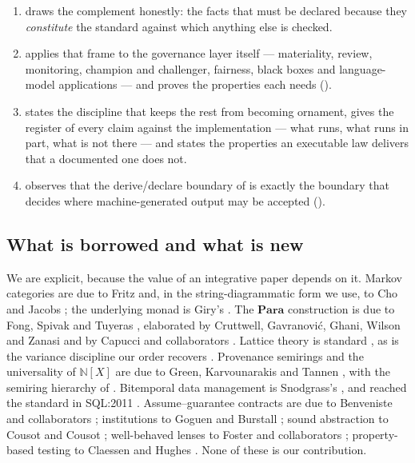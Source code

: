 \documentclass[11pt,a4paper]{article}
\renewcommand{\_}{\oldunderscore\allowbreak}
\theoremstyle{plain}
\theoremstyle{definition}
\theoremstyle{definition}
\theoremstyle{remark}
\newcommand{\Para}{\mathbf{Para}}
\newcommand{\Nat}{\mathbb{N}}
\begin{document}
\begin{enumerate}[leftmargin=*,itemsep=3pt]
      and totality together ().  treats the one class whose
      parameter object has logical rather than numerical structure, and states exactly what becomes
      decidable there and what does not ().
\item {} draws the complement honestly: the facts that must be declared because they
      \emph{constitute} the standard against which anything else is checked.
\item {} applies that frame to the governance layer itself --- materiality, review,
      monitoring, champion and challenger, fairness, black boxes and language-model applications --- and
      proves the properties each needs ().
\item {} states the discipline that keeps the rest from becoming ornament, gives the
      register of every claim against the implementation --- what runs, what runs in part, what is not
      there --- and states the properties an executable law delivers that a documented one does not.
\item {} observes that the derive/declare boundary of
       is exactly the boundary that decides where
      machine-generated output may be accepted ().
\end{enumerate}

\subsection{What is borrowed and what is new}

We are explicit, because the value of an integrative paper depends on it. Markov categories are due to
Fritz \cite{fritz2020} and, in the string-diagrammatic form we use, to Cho and Jacobs
\cite{chojacobs2019}; the underlying monad is Giry's \cite{giry1982}. The $\Para$ construction is due to
Fong, Spivak and Tuyeras \cite{fst2019}, elaborated by Cruttwell, Gavranovi\'c, Ghani, Wilson and Zanasi
\cite{cruttwell2022} and by Capucci and collaborators \cite{capucci2021}. Lattice theory is standard
\cite{davey2002,birkhoff1967}, as is the variance discipline our order recovers
\cite{cardelli1985,liskov1994}. Provenance semirings and the universality of $\Nat[X]$ are due to Green,
Karvounarakis and Tannen \cite{green2007,greentannen2017}, with the semiring hierarchy of
\cite{buneman2001,cheney2009}. Bitemporal data management is Snodgrass's \cite{snodgrass2000}, and
reached the standard in SQL:2011 \cite{kulkarni2012}. Assume--guarantee contracts are due to Benveniste
and collaborators \cite{benveniste2018}; institutions to Goguen and Burstall \cite{goguen1992}; sound
abstraction to Cousot and Cousot \cite{cousot1977}; well-behaved lenses to Foster and collaborators
\cite{foster2007}; property-based testing to Claessen and Hughes \cite{claessen2000}. None of these is
our contribution.
\end{document}
